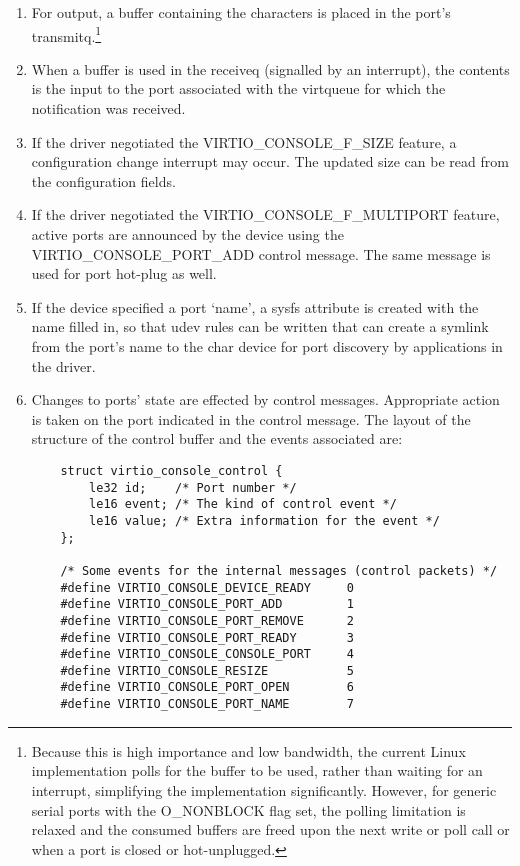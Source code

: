 \begin{enumerate}
\item For output, a buffer containing the characters is placed in
  the port's transmitq.\footnote{Because this is high importance and low bandwidth, the current
Linux implementation polls for the buffer to be used, rather than
waiting for an interrupt, simplifying the implementation
significantly. However, for generic serial ports with the
O_NONBLOCK flag set, the polling limitation is relaxed and the
consumed buffers are freed upon the next write or poll call or
when a port is closed or hot-unplugged.
}

\item When a buffer is used in the receiveq (signalled by an
  interrupt), the contents is the input to the port associated
  with the virtqueue for which the notification was received.

\item If the driver negotiated the VIRTIO_CONSOLE_F_SIZE feature, a
  configuration change interrupt may occur. The updated size can
  be read from the configuration fields.

\item If the driver negotiated the VIRTIO_CONSOLE_F_MULTIPORT
  feature, active ports are announced by the device using the
  VIRTIO_CONSOLE_PORT_ADD control message. The same message is
  used for port hot-plug as well.

\item If the device specified a port `name', a sysfs attribute is
  created with the name filled in, so that udev rules can be
  written that can create a symlink from the port's name to the
  char device for port discovery by applications in the driver.

\item Changes to ports' state are effected by control messages.
  Appropriate action is taken on the port indicated in the
  control message. The layout of the structure of the control
  buffer and the events associated are:

\begin{lstlisting}
	struct virtio_console_control {
		le32 id;    /* Port number */
		le16 event; /* The kind of control event */
		le16 value; /* Extra information for the event */
	};

	/* Some events for the internal messages (control packets) */
	#define VIRTIO_CONSOLE_DEVICE_READY     0
	#define VIRTIO_CONSOLE_PORT_ADD         1
	#define VIRTIO_CONSOLE_PORT_REMOVE      2
	#define VIRTIO_CONSOLE_PORT_READY       3
	#define VIRTIO_CONSOLE_CONSOLE_PORT     4
	#define VIRTIO_CONSOLE_RESIZE           5
	#define VIRTIO_CONSOLE_PORT_OPEN        6
	#define VIRTIO_CONSOLE_PORT_NAME        7
\end{lstlisting}
\end{enumerate}

